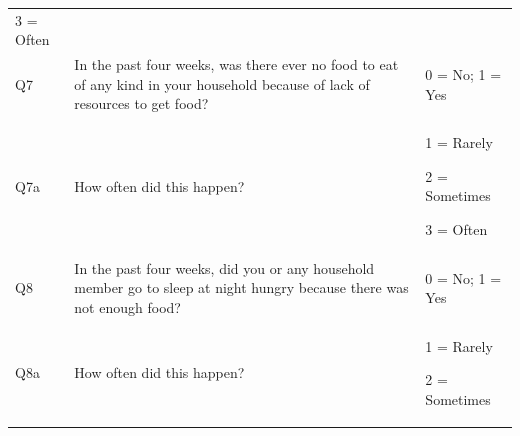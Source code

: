 \documentclass[12pt,]{book}
\theoremstyle{definition}
\theoremstyle{definition}
\theoremstyle{definition}
\theoremstyle{remark}
\begin{document}
\begin{longtable}[]{@{}lll@{}}
\begin{minipage}[t]{0.32\columnwidth}
3 = Often\strut
\end{minipage}\tabularnewline
\begin{minipage}[t]{0.07\columnwidth}\raggedright
Q7\strut
\end{minipage} & \begin{minipage}[t]{0.62\columnwidth}\raggedright
In the past four weeks, was there ever no food to eat of any kind in
your household because of lack of resources to get food?\strut
\end{minipage} & \begin{minipage}[t]{0.22\columnwidth}\raggedright
0 = No; 1 = Yes\strut
\end{minipage}\tabularnewline
\begin{minipage}[t]{0.32\columnwidth}\raggedright
Q7a\strut
\end{minipage} & \begin{minipage}[t]{0.32\columnwidth}\raggedright
How often did this happen?\strut
\end{minipage} & \begin{minipage}[t]{0.32\columnwidth}\raggedright
1 = Rarely

2 = Sometimes

3 = Often\strut
\end{minipage}\tabularnewline
\begin{minipage}[t]{0.07\columnwidth}\raggedright
Q8\strut
\end{minipage} & \begin{minipage}[t]{0.62\columnwidth}\raggedright
In the past four weeks, did you or any household member go to sleep at
night hungry because there was not enough food?\strut
\end{minipage} & \begin{minipage}[t]{0.22\columnwidth}\raggedright
0 = No; 1 = Yes\strut
\end{minipage}\tabularnewline
\begin{minipage}[t]{0.32\columnwidth}\raggedright
Q8a\strut
\end{minipage} & \begin{minipage}[t]{0.32\columnwidth}\raggedright
How often did this happen?\strut
\end{minipage} & \begin{minipage}[t]{0.32\columnwidth}\raggedright
1 = Rarely

2 = Sometimes


\end{minipage}
\end{longtable}
\end{document}
